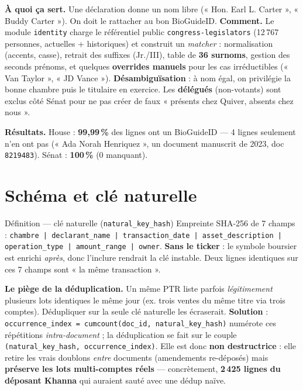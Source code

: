\documentclass[11pt,a4paper]{article}
\newcommand{\code}[1]{\texttt{\small #1}}
\begin{document}
\textbf{À quoi ça sert.} Une déclaration donne un nom libre (« Hon. Earl L. Carter », « Buddy Carter »).
On doit le rattacher au bon BioGuideID. \textbf{Comment.} Le module \code{identity} charge le référentiel
public \code{congress-legislators} (12\,767 personnes, actuelles + historiques) et construit un
\emph{matcher} : normalisation (accents, casse), retrait des suffixes (Jr./III), table de
\textbf{36 surnoms}, gestion des seconds prénoms, et quelques \textbf{overrides manuels} pour les cas
irréductibles (« Van Taylor », « JD Vance »). \textbf{Désambiguïsation} : à nom égal, on privilégie la
bonne chambre puis le titulaire en exercice. Les \textbf{délégués} (non-votants) sont exclus côté Sénat
pour ne pas créer de faux « présents chez Quiver, absents chez nous ».

\textbf{Résultats.} House : \textbf{99,99\,\%} des lignes ont un BioGuideID --- 4 lignes seulement n'en
ont pas (« Ada Norah Henriquez », un document manuscrit de 2023, doc \code{8219483}). Sénat :
\textbf{100\,\%} (0 manquant).

\section{Schéma et clé naturelle}

\begin{defbox}{Définition --- clé naturelle (\code{natural\_key\_hash})}
Empreinte SHA-256 de 7 champs : \code{chambre | declarant\_name | transaction\_date |
asset\_description | operation\_type | amount\_range | owner}. \textbf{Sans le ticker} : le symbole
boursier est enrichi \emph{après}, donc l'inclure rendrait la clé instable. Deux lignes identiques sur
ces 7 champs sont « la même transaction ».
\end{defbox}

\textbf{Le piège de la déduplication.} Un même PTR liste parfois \emph{légitimement} plusieurs lots
identiques le même jour (ex. trois ventes du même titre via trois comptes). Dédupliquer sur la seule clé
naturelle les écraserait. \textbf{Solution} : \code{occurrence\_index = cumcount(doc\_id,
natural\_key\_hash)} numérote ces répétitions \emph{intra-document} ; la déduplication se fait sur le
couple \code{(natural\_key\_hash, occurrence\_index)}. Elle est donc \textbf{non destructrice} : elle
retire les vrais doublons \emph{entre} documents (amendements re-déposés) mais \textbf{préserve les lots
multi-comptes réels} --- concrètement, \textbf{2\,425 lignes du déposant Khanna} qui auraient sauté avec
une dédup naïve.
\end{document}
